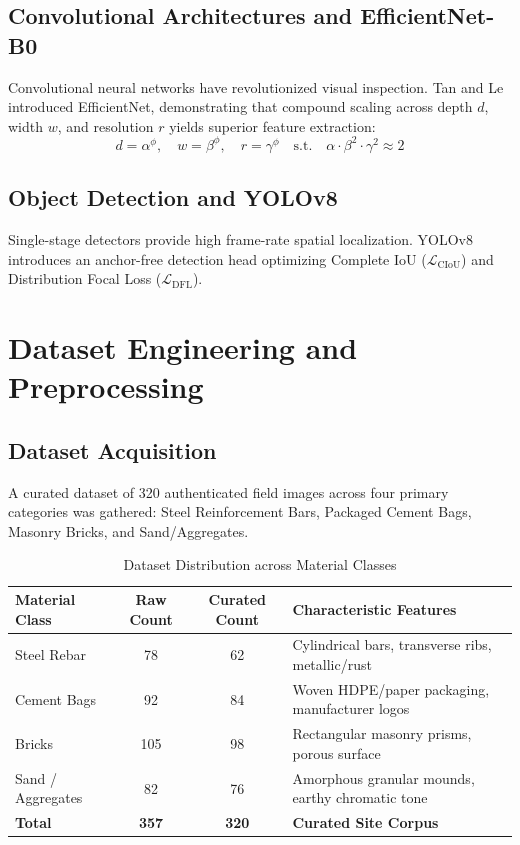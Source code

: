 \documentclass[12pt,a4paper]{report}
\theoremstyle{definition}
\begin{document}
\section{Convolutional Architectures and EfficientNet-B0}
Convolutional neural networks have revolutionized visual inspection. Tan and Le introduced EfficientNet, demonstrating that compound scaling across depth $d$, width $w$, and resolution $r$ yields superior feature extraction:
\begin{equation}
d = \alpha^\phi, \quad w = \beta^\phi, \quad r = \gamma^\phi \quad \text{s.t.} \quad \alpha \cdot \beta^2 \cdot \gamma^2 \approx 2
\end{equation}

\section{Object Detection and YOLOv8}
Single-stage detectors provide high frame-rate spatial localization. YOLOv8 introduces an anchor-free detection head optimizing Complete IoU ($\mathcal{L}_{\text{CIoU}}$) and Distribution Focal Loss ($\mathcal{L}_{\text{DFL}}$).

\chapter{Dataset Engineering and Preprocessing}
\section{Dataset Acquisition}
A curated dataset of 320 authenticated field images across four primary categories was gathered: Steel Reinforcement Bars, Packaged Cement Bags, Masonry Bricks, and Sand/Aggregates.

\begin{table}[H]
\centering
\caption{Dataset Distribution across Material Classes}
\begin{tabular}{|l|c|c|l|}
\hline
\textbf{Material Class} & \textbf{Raw Count} & \textbf{Curated Count} & \textbf{Characteristic Features} \\ \hline
Steel Rebar & 78 & 62 & Cylindrical bars, transverse ribs, metallic/rust \\ \hline
Cement Bags & 92 & 84 & Woven HDPE/paper packaging, manufacturer logos \\ \hline
Bricks & 105 & 98 & Rectangular masonry prisms, porous surface \\ \hline
Sand / Aggregates & 82 & 76 & Amorphous granular mounds, earthy chromatic tone \\ \hline
\textbf{Total} & \textbf{357} & \textbf{320} & \textbf{Curated Site Corpus} \\ \hline
\end{tabular}
\end{table}
\end{document}
